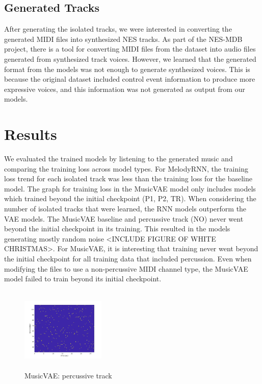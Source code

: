 \documentclass{article}
\begin{document}
\subsection{Generated Tracks}
After generating the isolated tracks, we were interested in converting the generated MIDI files into synthesized NES tracks. As part of the NES-MDB project, there is a tool for converting MIDI files from the dataset into audio files generated from synthesized track voices. However, we learned that the generated format from the models was not enough to generate synthesized voices. This is because the original dataset included control event information to produce more expressive voices, and this information was not generated as output from our models.


\section{Results}

We evaluated the trained models by listening to the generated music and comparing the training loss across model types. For MelodyRNN, the training loss trend for each isolated track was less than the training loss for the baseline model. The graph for training loss in the MusicVAE model only includes models which trained beyond the initial checkpoint (P1, P2, TR). When considering the number of isolated tracks that were learned, the RNN models outperform the VAE models. The MusicVAE baseline and percussive track (NO) never went beyond the initial checkpoint in its training. This resulted in the models generating mostly random noise <INCLUDE FIGURE OF WHITE CHRISTMAS>. For MusicVAE, it is interesting that training never went beyond the initial checkpoint for all training data that included percussion. Even when modifying the files to use a non-percussive MIDI channel type, the MusicVAE model failed to train beyond its initial checkpoint.

\begin{figure}[htb!]
  \begin{minipage}{1.0\textwidth}
    \centering
    \includegraphics[height=4cm, width=4cm]{img/vae_no.jpg}
    \caption{MusicVAE: percussive track}
  \end{minipage}
\end{figure}
\end{document}
